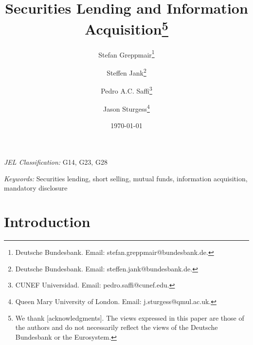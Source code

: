 %





\doublespacing

\title{Securities Lending and Information Acquisition\thanks{We thank [acknowledgments]. The views expressed in this paper are those of the authors and do not necessarily reflect the views of the Deutsche Bundesbank or the Eurosystem.}}

\author{
Stefan Greppmair\thanks{Deutsche Bundesbank. Email: stefan.greppmair@bundesbank.de.} \and
Steffen Jank\thanks{Deutsche Bundesbank. Email: steffen.jank@bundesbank.de.} \and
Pedro A.C. Saffi\thanks{CUNEF Universidad. Email: pedro.saffi@cunef.edu.} \and
Jason Sturgess\thanks{Queen Mary University of London. Email: j.sturgess@qmul.ac.uk.}
}

\date{\today}

\maketitle

\begin{abstract}

\end{abstract}

\bigskip
\noindent \textit{JEL Classification:} G14, G23, G28

\noindent \textit{Keywords:} Securities lending, short selling, mutual funds, information acquisition, mandatory disclosure

\newpage

\section{Introduction}
\label{sec:introduction}


